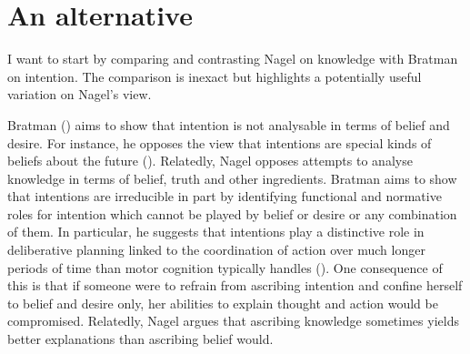 \documentclass[11pt,a4paper]{extarticle}
\begin{document}
\setlength\footnotesep{1em}




\maketitle

\begin{abstract}
\noindent
***


\end{abstract}




\section{An alternative}
I want to start by
comparing and contrasting
Nagel on knowledge
with 
Bratman on intention.
The comparison is inexact but highlights a potentially useful variation on Nagel's view.

Bratman
(\citeyear{bratman_faces_1999,Bratman:1987xw})
aims to show that intention is not analysable in terms of belief and desire.
For instance, he opposes the view that intentions are special kinds of beliefs about the future (\citeyear[pp.\ 257ff]{bratman_faces_1999}).
Relatedly, Nagel
opposes attempts to analyse knowledge in terms of belief, truth and other ingredients.
Bratman aims to show that intentions are irreducible in part by  identifying functional and normative roles for intention which cannot be played by belief or desire or any combination of them.
In particular, he suggests that intentions play a distinctive role in deliberative planning linked to the coordination of action over  much longer periods of time than motor cognition typically handles
(\citeyear[p.\ 223]{bratman_faces_1999}).
One consequence of this is that if someone were to refrain from ascribing intention and confine herself to belief and desire only, her abilities to explain thought and action would be compromised.
Relatedly, Nagel argues that ascribing knowledge sometimes yields  better explanations than ascribing belief would.
\end{document}
